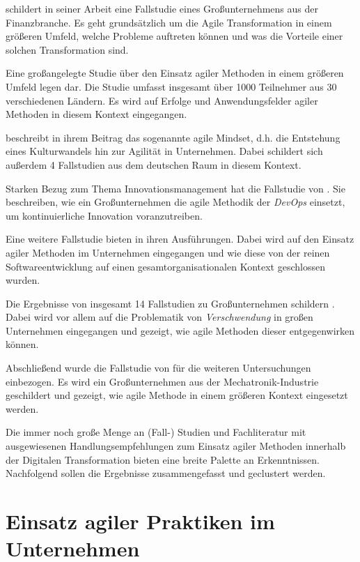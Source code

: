  schildert in seiner Arbeit eine Fallstudie eines Großunternehmens aus der Finanzbranche. Es geht grundsätzlich um die Agile Transformation in einem größeren Umfeld, welche Probleme auftreten können und was die Vorteile einer solchen Transformation sind.

Eine großangelegte Studie über den Einsatz agiler Methoden in einem größeren Umfeld legen  dar. Die Studie umfasst insgesamt über 1000 Teilnehmer aus 30 verschiedenen Ländern. Es wird auf Erfolge und Anwendungsfelder agiler Methoden in diesem Kontext eingegangen.

 beschreibt in ihrem Beitrag das sogenannte agile Mindset, d.h. die Entstehung eines Kulturwandels hin zur Agilität in Unternehmen. Dabei schildert sich außerdem 4 Fallstudien aus dem deutschen Raum in diesem Kontext. 

Starken Bezug zum Thema Innovationsmanagement hat die Fallstudie von . Sie beschreiben, wie ein Großunternehmen die agile Methodik der \textit{DevOps} einsetzt, um kontinuierliche Innovation voranzutreiben.

Eine weitere Fallstudie bieten  in ihren Ausführungen. Dabei wird auf den Einsatz agiler Methoden im Unternehmen eingegangen und wie diese von der reinen Softwareentwicklung auf einen gesamtorganisationalen Kontext geschlossen wurden.

Die Ergebnisse von insgesamt 14 Fallstudien zu Großunternehmen schildern . Dabei wird vor allem auf die Problematik von \textit{Verschwendung} in großen Unternehmen eingegangen und gezeigt, wie agile Methoden dieser entgegenwirken können.

Abschließend wurde die Fallstudie von  für die weiteren Untersuchungen einbezogen. Es wird ein Großunternehmen aus der Mechatronik-Industrie geschildert und gezeigt, wie agile Methode in einem größeren Kontext eingesetzt werden. 

Die immer noch große Menge an (Fall-) Studien und Fachliteratur mit ausgewiesenen Handlungsempfehlungen zum Einsatz agiler Methoden innerhalb der Digitalen Transformation bieten eine breite Palette an Erkenntnissen. Nachfolgend sollen die Ergebnisse zusammengefasst und geclustert werden.

\section{Einsatz agiler Praktiken im Unternehmen}
\label{agilepractices:extractions}

